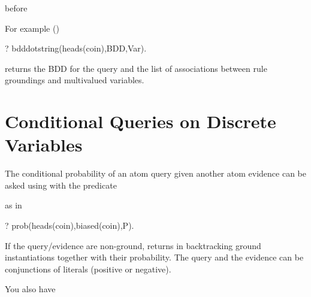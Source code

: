 \documentclass[letterpaper,10pt,english]{sphinxmanual}
\begin{document}
\begin{sphinxVerbatim}[commandchars=\\\{\}]
 
\end{sphinxVerbatim}

before 

For example ()

\begin{sphinxVerbatim}[commandchars=\\\{\}]
?\PYGZhy{} bdd\PYGZus{}dot\PYGZus{}string(heads(coin),BDD,Var).
\end{sphinxVerbatim}

returns the BDD for the query  and the list of associations between rule groundings
and multivalued variables.


\section{Conditional Queries on Discrete Variables}
\label{\detokenize{index:conditional-queries-on-discrete-variables}}
The conditional probability of an atom query given another atom evidence can be asked using 
with the predicate

\begin{sphinxVerbatim}[commandchars=\\\{\}]
  
\end{sphinxVerbatim}

as in

\begin{sphinxVerbatim}[commandchars=\\\{\}]
?\PYGZhy{} prob(heads(coin),biased(coin),P).
\end{sphinxVerbatim}

If the query/evidence are non-ground,  returns in backtracking ground
instantiations together with their probability.
The query and the evidence can be conjunctions of literals (positive or negative).

You also have

\begin{sphinxVerbatim}[commandchars=\\\{\}]
  
\end{sphinxVerbatim}
\end{document}
